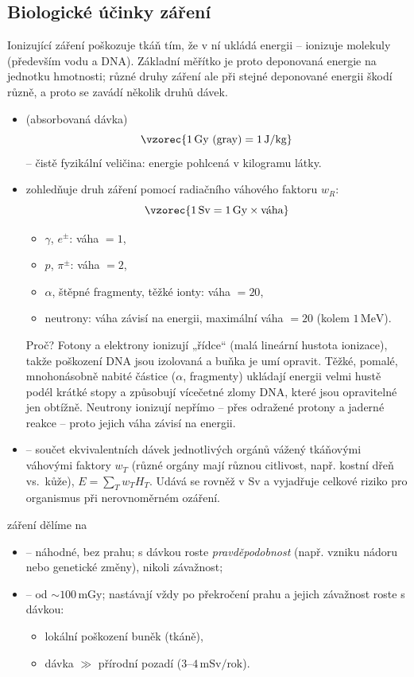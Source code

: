 \subsection{Biologické účinky záření}

Ionizující záření poškozuje tkáň tím, že v ní ukládá energii – ionizuje
molekuly (především vodu a DNA). Základní měřítko je proto deponovaná
energie na jednotku hmotnosti; různé druhy záření ale při stejné deponované
energii škodí různě, a proto se zavádí několik druhů dávek.

\begin{itemize}
  \item {} (absorbovaná dávka)
  \[
    \vzorec{1\,\text{Gy}\ (\text{gray}) = 1\,\text{J}/\text{kg}}
  \]
  – čistě fyzikální veličina: energie pohlcená v kilogramu látky.
  \item {} zohledňuje druh záření pomocí radiačního
  váhového faktoru \(w_R\):
  \[
    \vzorec{1\,\text{Sv} = 1\,\text{Gy}\times\text{váha}}
  \]
  \begin{itemize}
    \item \(\gamma\), \(e^\pm\): váha \(=1\),
    \item \(p\), \(\pi^\pm\): váha \(=2\),
    \item \(\alpha\), štěpné fragmenty, těžké ionty: váha \(=20\),
    \item neutrony: váha závisí na energii, maximální váha \(=20\)
    (kolem \(1\,\text{MeV}\)).
  \end{itemize}
  Proč? Fotony a elektrony ionizují „řídce`` (malá lineární hustota
  ionizace), takže poškození DNA jsou izolovaná a buňka je umí opravit.
  Těžké, pomalé, mnohonásobně nabité částice (\(\alpha\), fragmenty) ukládají
  energii velmi hustě podél krátké stopy a způsobují vícečetné zlomy DNA,
  které jsou opravitelné jen obtížně. Neutrony ionizují nepřímo – přes
  odražené protony a jaderné reakce – proto jejich váha závisí na energii.
  \item {} – součet ekvivalentních dávek jednotlivých
  orgánů vážený tkáňovými váhovými faktory \(w_T\) (různé orgány mají různou
  citlivost, např. kostní dřeň vs.\ kůže), \(E = \sum_T w_T H_T\). Udává se
  rovněž v Sv a vyjadřuje celkové riziko pro organismus při nerovnoměrném
  ozáření.
\end{itemize}

 záření dělíme na
\begin{itemize}
  \item {} – náhodné, bez prahu; s dávkou roste
  \emph{pravděpodobnost} (např. vzniku nádoru nebo genetické změny), nikoli
  závažnost;
  \item {} – od \(\sim 100\,\text{mGy}\); nastávají vždy po
  překročení prahu a jejich závažnost roste s dávkou:
  \begin{itemize}
    \item lokální poškození buněk (tkáně),
    \item dávka \(\gg\) přírodní pozadí (\(3\)–\(4\,\text{mSv}/\text{rok}\)).
  \end{itemize}
\end{itemize}


